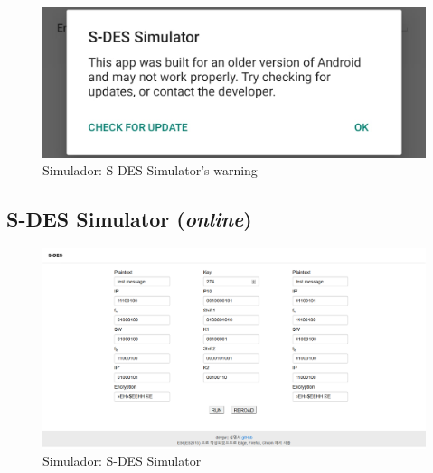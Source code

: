 \begin{figure}[H]
    \centering
    \caption{Simulador: S-DES Simulator's warning}
    \label{fig:sdessimulatorappwarning}
    \includegraphics[width=.55\linewidth]{Simuladores/SDESSimulatorAppWarning.jpeg}
\end{figure}


\subsection{S-DES Simulator (\textit{online})}

\begin{figure}[H]
    \centering
    \caption{Simulador: S-DES Simulator}
    \label{fig:sdessimulatorkr}
    \includegraphics[width=1.2\linewidth,center]{Simuladores/SDESSimulatorKr.png}
\end{figure}


